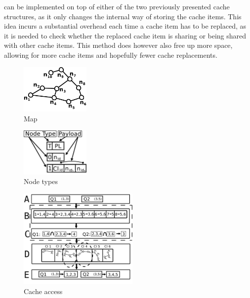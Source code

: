 can be implemented on top of either of the two previously presented cache structures, as it only changes the internal way of storing the cache items. This idea incurs a substantial overhead each time a cache item has to be replaced, as it is needed to check whether the replaced cache item is sharing or being shared with other cache items. This method does however also free up more space, allowing for more cache items and hopefully fewer cache replacements.


\begin{figure}
  \center
	\includegraphics[width=0.3\textwidth]{figures/map10n.pdf}
	\caption{Map}
  \label{fig:map10}
\end{figure}

\begin{figure}
  \center
	\includegraphics[width=0.3\textwidth]{figures/nodeType.pdf}
	\caption{Node types}
  \label{fig:nodetypes}
\end{figure}

\begin{figure}
  \center
	\includegraphics[width=0.52\textwidth]{figures/cacheTwoLayer.pdf}
	\caption{Cache access}
  \label{fig:cachestruc}
\end{figure}


